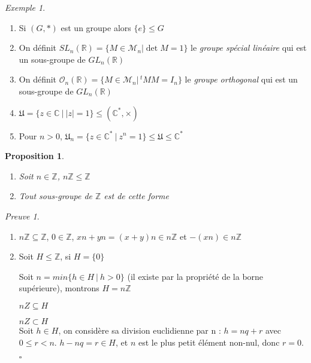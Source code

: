 \documentclass[]{article}
\newtheorem{myproposition}{Proposition}
\theoremstyle{remark}
\newtheorem{myproof}{Preuve}
\newtheorem{myexmpl}{Exemple}
\theoremstyle{definition}
\newcommand{\cqfd}{
	\hfill$\square$
}
\newenvironment{proofpart}[1]{
	\noindent
	{\boldmath #1}
}{
	\checkmark
}
\begin{document}
\begin{myexmpl}
	\begin{enumerate}
		\item Si $(G, *)$ est un groupe alors $\{e\} \leqslant G$
		\item On définit $SL_n(\mathbb{R})=\{M \in \mathcal{M}_n | \det M = 1\}$ le \textit{groupe spécial linéaire} qui est un sous-groupe de $GL_n(\mathbb{R})$
		\item On définit $\mathcal{O}_n(\mathbb{R})=\{M \in \mathcal{M}_n | \,^tMM = I_n\}$ le \textit{groupe orthogonal} qui est un sous-groupe de $GL_n(\mathbb{R})$
		\item $\mathfrak{U} = \{z \in \mathbb{C} ~ | ~ |z| = 1\} \leqslant (\mathbb{C}^*, \times)$
		\item Pour $n > 0$, $\mathfrak{U}_n = \{z \in \mathbb{C}^* ~ | ~ z^n = 1\} \leqslant \mathfrak{U} \leqslant \mathbb{C}^*$
	\end{enumerate}
\end{myexmpl}

\begin{myproposition}
	\leavevmode
	\begin{enumerate}
		\item Soit $n \in \mathbb{Z}$, $n\mathbb{Z} \leqslant \mathbb{Z}$
		\item Tout sous-groupe de $\mathbb{Z}$ est de cette forme
	\end{enumerate}
\end{myproposition}

\begin{myproof}
	\leavevmode
	\begin{enumerate}
		\item $n\mathbb{Z} \subseteq \mathbb{Z}$, $0 \in \mathbb{Z}$, $xn + yn = (x+y)n \in n\mathbb{Z}$ et $-(xn) \in n\mathbb{Z}$
		\item Soit $H \leqslant \mathbb{Z}$, si $H = \{0\}$ \checkmark
		
		Soit $n = min\{h \in H ~|~ h > 0\}$ (il existe par la propriété de la borne supérieure), montrons $H = n\mathbb{Z}$

		\begin{proofpart}{$nZ \subseteq H$}
		\end{proofpart}

		\begin{proofpart}{$nZ \subset H$}\\			
			Soit $h \in H$, on considère sa division euclidienne par n : $h = nq + r$ avec $0 \leqslant r < n$.
			$h - nq = r\in H$, et $n$ est le plus petit élément non-nul, donc $r = 0$.
		\end{proofpart}
		
		\cqfd
	\end{enumerate}
\end{myproof}
\end{document}

